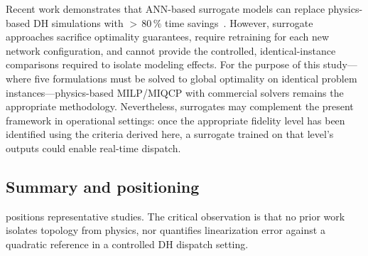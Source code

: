 \documentclass[review,3p]{elsarticle}
\begin{document}
Recent work demonstrates that ANN-based surrogate models can replace
physics-based DH simulations with ${>}\,80\,\%$ time
savings~\cite{Guo2025}. However, surrogate approaches sacrifice
optimality guarantees, require retraining for each new network
configuration, and cannot provide the controlled, identical-instance
comparisons required to isolate modeling effects. For the purpose of
this study---where five formulations must be solved to global
optimality on identical problem instances---physics-based MILP/MIQCP
with commercial solvers remains the appropriate methodology.
Nevertheless, surrogates may complement the present framework in
operational settings: once the appropriate fidelity level has been
identified using the criteria derived here, a surrogate trained on
that level's outputs could enable real-time dispatch.

\subsection{Summary and positioning}
\label{sec:rw_summary}

 positions representative studies. The critical
observation is that no prior work isolates topology from physics, nor
quantifies linearization error against a quadratic reference in a
controlled DH dispatch setting.
\end{document}
